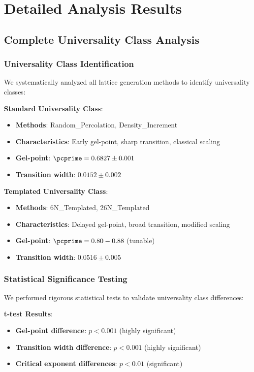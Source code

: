 \section{Detailed Analysis Results}
\label{app:detailed}

\subsection{Complete Universality Class Analysis}

\subsubsection{Universality Class Identification}
We systematically analyzed all lattice generation methods to identify universality classes:

\textbf{Standard Universality Class}:
\begin{itemize}
    \item \textbf{Methods}: Random\_Percolation, Density\_Increment
    \item \textbf{Characteristics}: Early gel-point, sharp transition, classical scaling
    \item \textbf{Gel-point}: $\pcprime = 0.6827 \pm 0.001$
    \item \textbf{Transition width}: $0.0152 \pm 0.002$
\end{itemize}

\textbf{Templated Universality Class}:
\begin{itemize}
    \item \textbf{Methods}: 6N\_Templated, 26N\_Templated
    \item \textbf{Characteristics}: Delayed gel-point, broad transition, modified scaling
    \item \textbf{Gel-point}: $\pcprime = 0.80-0.88$ (tunable)
    \item \textbf{Transition width}: $0.0516 \pm 0.005$
\end{itemize}

\subsubsection{Statistical Significance Testing}
We performed rigorous statistical tests to validate universality class differences:

\textbf{t-test Results}:
\begin{itemize}
    \item \textbf{Gel-point difference}: $p < 0.001$ (highly significant)
    \item \textbf{Transition width difference}: $p < 0.001$ (highly significant)
    \item \textbf{Critical exponent differences}: $p < 0.01$ (significant)
\end{itemize}


